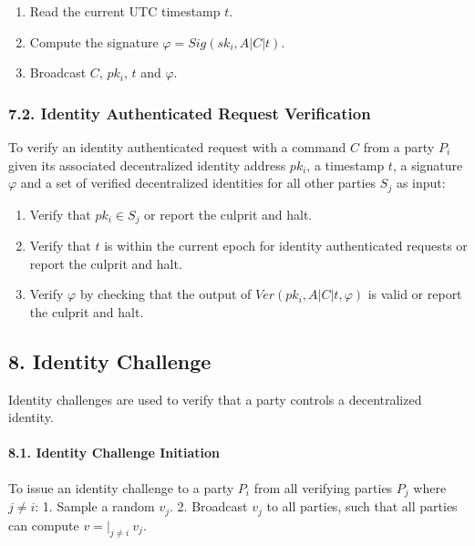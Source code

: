 \documentclass[
]{article}
\providecommand{\tightlist}{%
  \setlength{\itemsep}{0pt}\setlength{\parskip}{0pt}}
\begin{document}
\begin{enumerate}
\def\labelenumi{\arabic{enumi}.}
\tightlist
\item
  Read the current UTC timestamp \(t\).
\item
  Compute the signature \(\varphi = Sig(sk_i, A | C | t)\).
\item
  Broadcast \(C\), \(pk_i\), \(t\) and \(\varphi\).
\end{enumerate}

\hypertarget{identity-authed-request-verification}{%
\subsubsection{7.2. Identity Authenticated Request
Verification}\label{identity-authed-request-verification}}

To verify an identity authenticated request with a command \(C\) from a
party \(P_i\) given its associated decentralized identity address
\(pk_i\), a timestamp \(t\), a signature \(\varphi\) and a set of
verified decentralized identities for all other parties \(S_j\) as
input:

\begin{enumerate}
\def\labelenumi{\arabic{enumi}.}
\tightlist
\item
  Verify that \(pk_i \in S_j\) or report the culprit and halt.
\item
  Verify that \(t\) is within the current epoch for identity
  authenticated requests or report the culprit and halt.
\item
  Verify \(\varphi\) by checking that the output of
  \(Ver(pk_i, A | C | t, \varphi)\) is valid or report the culprit and
  halt.
\end{enumerate}

\hypertarget{identity-challenge}{%
\subsection{8. Identity Challenge}\label{identity-challenge}}

Identity challenges are used to verify that a party controls a
decentralized identity.

\hypertarget{identity-challenge-initiation}{%
\paragraph{8.1. Identity Challenge
Initiation}\label{identity-challenge-initiation}}

To issue an identity challenge to a party \(P_i\) from all verifying
parties \(P_j\) where \(j \neq i\): 1. Sample a random \(v_j\). 2.
Broadcast \(v_j\) to all parties, such that all parties can compute
\(v = | _{j \neq i} \: v_j\).
\end{document}

